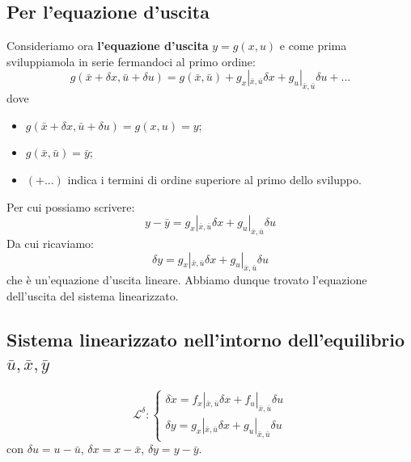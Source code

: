 \subsection{Per l'equazione d'uscita}
Consideriamo ora \textbf{l'equazione d'uscita} $y = g(x,u)$ e come prima sviluppiamola in serie fermandoci al primo ordine:
\[
    g(\bar{x} + \delta x , \bar{u} + \delta u) = g(\bar{x}, \bar{u}) + g_x|_{\bar{x}, \bar{u}} \delta x + g_u |_{\bar{x}, \bar{u}} \delta u + ...
\]
dove
\begin{itemize}
    \item $g(\bar{x} + \delta x , \bar{u} + \delta u) = g(x,u) = y$;
    \item $g(\bar{x}, \bar{u}) =\bar{y}$;
    \item $(+ ...)$ indica i termini di ordine superiore al primo dello sviluppo.
\end{itemize}
Per cui possiamo scrivere:
\[
    y - \bar{y} = g_x|_{\bar{x}, \bar{u}} \delta x + g_u |_{\bar{x}, \bar{u}} \delta u
\]
Da cui ricaviamo:
\[
    \delta y = g_x|_{\bar{x}, \bar{u}} \delta x + g_u |_{\bar{x}, \bar{u}} \delta u
\]
che è un'equazione d'uscita lineare.\newline
\newline
Abbiamo dunque trovato l'equazione dell'uscita del sistema linearizzato.
\subsection{Sistema linearizzato nell'intorno dell'equilibrio $\bar{u}, \bar{x}, \bar{y}$}
\[
    \mathcal{L}^\delta : \begin{cases}
        \delta \dot{x} = f_x |_{\bar{x},\bar{u}} \delta x + f_u|_{\bar{x},\bar{u}} \delta u\\
        \delta y = g_x|_{\bar{x},\bar{u}} \delta x + g_u |_{\bar{x},\bar{u}} \delta u
    \end{cases}
\]
con $ \delta u = u - \bar{u}$, $\delta x = x -\bar{x}$, $ \delta y = y - \bar{y}$.
